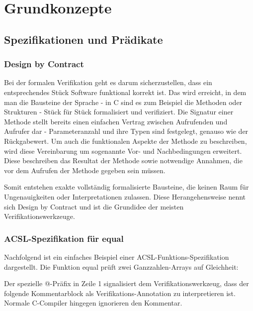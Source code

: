 ﻿
\chapter{Grundkonzepte}

\section{Spezifikationen und Prädikate}
\label{sec:design-by-contract}
\subsection{Design by Contract}

Bei der formalen Verifikation geht es darum sicherzustellen, dass ein entsprechendes Stück Software
funktional korrekt ist. Das wird erreicht, in dem man die Bausteine der Sprache - in C sind es zum Beispiel die Methoden 
oder Strukturen -
Stück für Stück formalisiert und verifiziert. Die Signatur einer Methode stellt bereits einen einfachen Vertrag zwischen
Aufrufenden und Aufrufer dar - Parameteranzahl und ihre Typen sind festgelegt, genauso wie der Rückgabewert.
Um auch die funktionalen Aspekte der Methode zu beschreiben, wird diese Vereinbarung um sogenannte Vor- und Nachbedingungen erweitert.
Diese beschreiben das Resultat der Methode sowie notwendige Annahmen, die vor dem Aufrufen der Methode gegeben sein müssen. 

Somit entstehen exakte vollständig formalisierte Bausteine, die keinen Raum für Ungenauigkeiten oder Interpretationen zulassen.
Diese Herangehensweise nennt sich Design by Contract und ist die Grundidee der meisten Verifikationswerkzeuge.



\subsection{ACSL-Spezifikation für equal}
\label{sec:design-by-contract:acsl-spezifikation}

Nachfolgend ist ein einfaches Beispiel einer ACSL-Funktions-Spezifikation dargestellt.
Die Funktion equal prüft zwei Ganzzahlen-Arrays auf Gleichheit:



Der spezielle @-Präfix in Zeile 1 signalisiert dem Verifikationswerkzeug, 
dass der folgende Kommentarblock als Verifikations-Annotation zu interpretieren ist. Normale C-Compiler hingegen
ignorieren den Kommentar.

